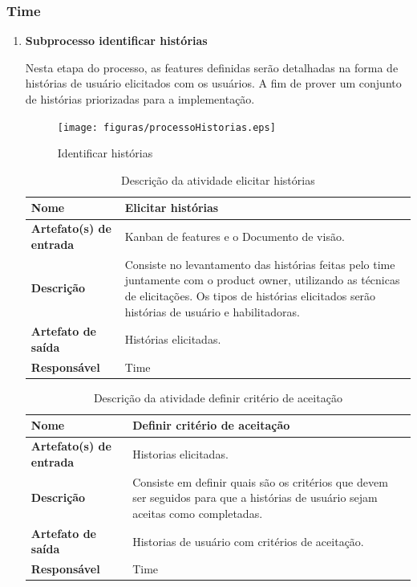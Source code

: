     \subsubsection{Time}
    \begin{enumerate}
    \item \textbf{ Subprocesso identificar histórias}

    Nesta etapa do processo, as features definidas serão detalhadas na forma de histórias de usuário elicitados com os usuários. A fim de prover um conjunto de histórias priorizadas para a implementação.

    \begin{figure}[H]
        \centering
        \caption{Identificar histórias}
        \label{processoHistorias}
        \texttt{[image: figuras/processoHistorias.eps]}
    \end{figure}

    \begin{table}[H]
        \centering
        \label{descricaoAtividades15}
        \caption{Descrição da atividade elicitar histórias}
            \begin{tabular}{|l|p{10cm}|}
            \hline
            \textbf{Nome} & Elicitar histórias \\
            \hline
            \textbf{Artefato(s) de entrada} & Kanban de features e o Documento de visão. \\
            \hline
            \textbf{Descrição} & Consiste no levantamento das histórias feitas pelo time juntamente com o product owner, utilizando as técnicas de elicitações. Os tipos de histórias elicitados serão histórias de usuário e habilitadoras. \\
            \hline
            \textbf{Artefato de saída} & Histórias elicitadas. \\
            \hline
            \textbf{Responsável} & Time \\
            \hline
        \end{tabular}
    \end{table}

    \begin{table}[H]
        \centering
        \label{descricaoAtividades16}
        \caption{Descrição da atividade definir critério de aceitação}
            \begin{tabular}{|l|p{10cm}|}
            \hline
            \textbf{Nome} & Definir critério de aceitação \\
            \hline
            \textbf{Artefato(s) de entrada} & Historias elicitadas. \\
            \hline
            \textbf{Descrição} & Consiste em definir quais são os critérios que devem ser seguidos para que a histórias de usuário sejam aceitas como completadas. \\
            \hline
            \textbf{Artefato de saída} & Historias de usuário com critérios de aceitação. \\
            \hline
            \textbf{Responsável} & Time \\
            \hline
        \end{tabular}
    \end{table}


\end{enumerate}
